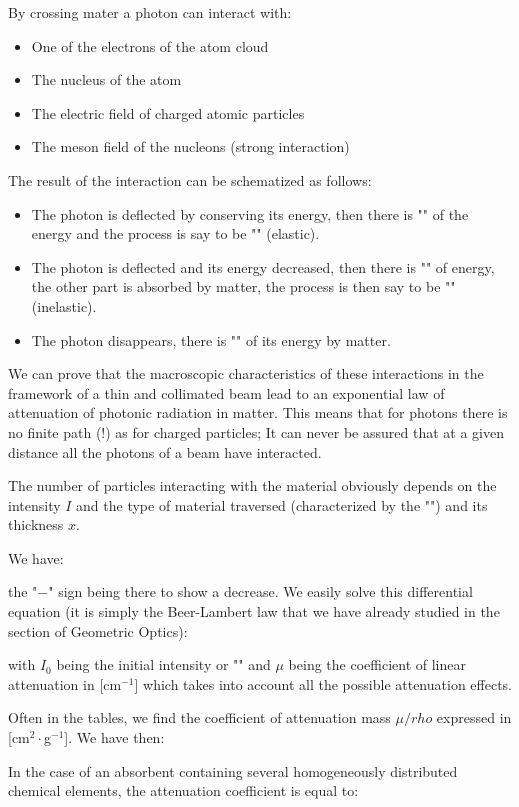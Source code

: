 	By crossing mater a photon can interact with:
	\begin{itemize}
		\item One of the electrons of the atom cloud

		\item The nucleus of the atom

		\item  The electric field of charged atomic particles

		\item The meson field of the nucleons (strong interaction)
	\end{itemize}
	The result of the interaction can be schematized as follows:
	\begin{itemize}
		\item The photon is deflected by conserving its energy, then there is "" of the energy and the process is say to be "" (elastic).

		\item The photon is deflected and its energy decreased, then there is "" of energy, the other part is absorbed by matter, the process is then say to be "" (inelastic).

		\item The photon disappears, there is "" of its energy by matter.
	\end{itemize}
	We can prove that the macroscopic characteristics of these interactions in the framework of a thin and collimated beam lead to an exponential law of attenuation of photonic radiation in matter. This means that for photons there is no finite path (!) as for charged particles; It can never be assured that at a given distance all the photons of a beam have interacted.

	The number of particles interacting with the material obviously depends on the intensity $I$ and the type of material traversed (characterized by the "") and its thickness $x$.

	We have:
	
	the "$-$" sign being there to show a decrease. We easily solve this differential equation (it is simply the Beer-Lambert law that we have already studied in the section of Geometric Optics):
	
	with $I_0$ being the initial intensity or "" and $\mu$ being the coefficient of linear attenuation in [cm$^{-1}$] which takes into account all the possible attenuation effects.
	\begin{tcolorbox}[title=Remark,colframe=black,arc=10pt]
	Often in the tables, we find the coefficient of attenuation mass $\mu/rho$ expressed in [cm$^2\cdot$g$^{-1}$]. We have then:
	
	\end{tcolorbox}
	In the case of an absorbent containing several homogeneously distributed chemical elements, the attenuation coefficient is equal to:
	
